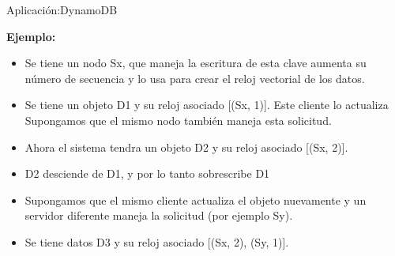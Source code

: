 \begin{frame}[fragile]{Aplicación:}{DynamoDB}
    \justifying

    {\bf Ejemplo:}\\[0.3cm]

\begin{itemize}

\item Se tiene un nodo Sx, que maneja la escritura de esta clave aumenta su número
de secuencia y lo usa para crear el reloj vectorial de los datos.

\item Se tiene un objeto D1 y su reloj asociado [(Sx, 1)]. Este cliente lo actualiza
Supongamos que el mismo nodo también maneja esta solicitud.

\item Ahora el sistema tendra un objeto D2 y su reloj asociado [(Sx, 2)].

\item D2 desciende de D1, y por lo tanto sobrescribe D1

\item Supongamos que el mismo cliente actualiza el objeto nuevamente y un
servidor diferente maneja la solicitud (por ejemplo Sy).

\item Se tiene datos D3 y su reloj asociado [(Sx, 2), (Sy, 1)].


\end{itemize}


\end{frame}
